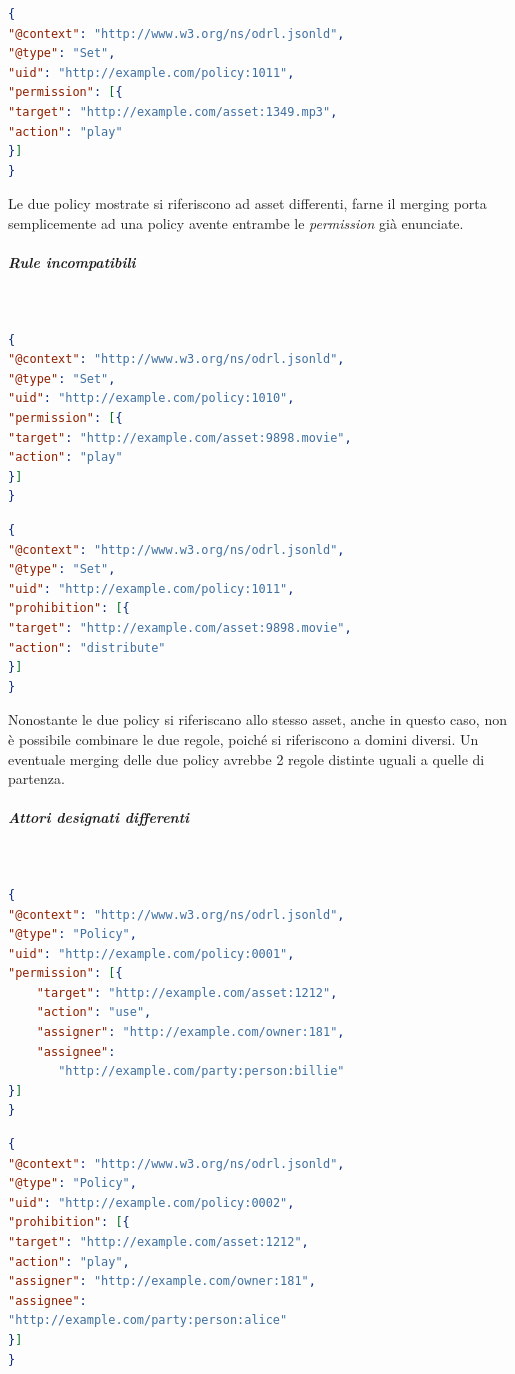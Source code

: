 \documentclass[12pt,a4paper,twoside]{book}
\begin{document}
\begin{lstlisting}[language=json,firstnumber=1,caption={La policy 1011 consente la riproduzione dell'asset 1349.mp3 a chiunque},captionpos=b]
{
"@context": "http://www.w3.org/ns/odrl.jsonld",
"@type": "Set",
"uid": "http://example.com/policy:1011",
"permission": [{
"target": "http://example.com/asset:1349.mp3",
"action": "play"
}]
}
\end{lstlisting}
Le due policy mostrate si riferiscono ad asset differenti, farne il merging porta semplicemente ad una policy avente entrambe le \textit{permission} già enunciate.
\subparagraph{Rule incompatibili}\mbox{}\\
\begin{lstlisting}[language=json,firstnumber=1,caption={La policy 1010 consente la riproduzione dell'asset 9898.movie a chiunque},captionpos=b]
{
"@context": "http://www.w3.org/ns/odrl.jsonld",
"@type": "Set",
"uid": "http://example.com/policy:1010",
"permission": [{
"target": "http://example.com/asset:9898.movie",
"action": "play"
}]
}
\end{lstlisting}
\begin{lstlisting}[language=json,firstnumber=1,caption={La policy 1011 proibisce la distribuzione dell'asset 9898.movie a chiunque},captionpos=b]
{
"@context": "http://www.w3.org/ns/odrl.jsonld",
"@type": "Set",
"uid": "http://example.com/policy:1011",
"prohibition": [{
"target": "http://example.com/asset:9898.movie",
"action": "distribute"
}]
}
\end{lstlisting}
Nonostante le due policy si riferiscano allo stesso asset, anche in questo caso, non è possibile combinare le due regole, poiché si riferiscono a domini diversi. Un eventuale merging delle due policy avrebbe 2 regole distinte uguali a quelle di partenza.\newpage
\subparagraph{Attori designati differenti}\mbox{}\\
\begin{lstlisting}[language=json,firstnumber=1,caption={La policy 0001 permette un qualsiasi utilizzo dell'asset 1212 da parte del soggetto Billie},captionpos=b]
{
"@context": "http://www.w3.org/ns/odrl.jsonld",
"@type": "Policy",
"uid": "http://example.com/policy:0001",
"permission": [{
	"target": "http://example.com/asset:1212",
	"action": "use",
	"assigner": "http://example.com/owner:181",
	"assignee": 
	   "http://example.com/party:person:billie"
}]
}
\end{lstlisting}
\begin{lstlisting}[language=json,firstnumber=1,caption={La policy 0002 proibisce la riproduzione dell'asset 1212 da parte del soggetto Alice},captionpos=b]
{
"@context": "http://www.w3.org/ns/odrl.jsonld",
"@type": "Policy",
"uid": "http://example.com/policy:0002",
"prohibition": [{
"target": "http://example.com/asset:1212",
"action": "play",
"assigner": "http://example.com/owner:181",
"assignee": 
"http://example.com/party:person:alice"
}]
}
\end{lstlisting}
\end{document}
